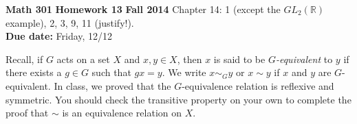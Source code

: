 \documentclass[12pt,reqno]{amsart}
\newcommand{\<}{\ensuremath{\langle}}
\renewcommand{\>}{\ensuremath{\rangle}}
\newcommand{\boldemph}{\emph}
\begin{document}
\thispagestyle{empty}

\noindent \textbf{Math 301} \hskip5cm {\bf Homework 13} \hfill {\bf Fall 2014}
\vskip1cm
 Chapter 14: 1 (except the $GL_2( {\mathbb R} )$
example), 2, 3, 9, 11 (justify!).\\
{\bf Due date:} Friday, 12/12

\medskip
Recall, if $G$ acts on a set $X$ and $x, y \in X$, then $x$ is said
to be \boldemph{$G$-equivalent} to $y$ if there exists a $g \in G$ such that 
$gx =y$. We  write $x \sim_G y$ or $x \sim y$ if $x$ and $y$ are $G$-equivalent. 
In class, we proved that the $G$-equivalence relation is reflexive and
symmetric. You should check the transitive property on your own to complete the
proof that $\sim$ is an equivalence relation on $X$. 
 
\end{document}
